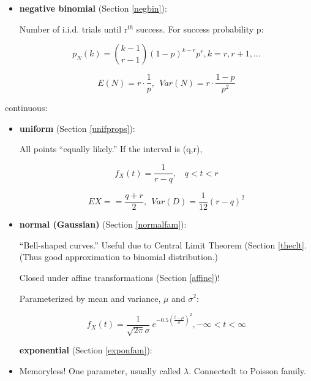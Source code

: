 \begin{itemize}
\begin{itemize}
   \item {\bf negative binomial} (Section \ref{negbin}):

   Number of i.i.d. trials until r$^{th}$ success.  For success
   probability p: 

   \begin{equation}
   p_N(k) =  \binom{k-1}{r-1} (1-p)^{k-r} p^r, k = r, r+1, ...
   \end{equation}

   \begin{equation}
   E(N) = r \cdot \frac{1}{p}, ~~ Var(N) = r \cdot \frac{1-p}{p^2}
   \end{equation}

   \end{itemize}

continuous:

   \begin{itemize}

   \item {\bf uniform} (Section \ref{unifprops}):

   All points ``equally likely.''  If the interval is (q,r),

   \begin{equation}
   f_X(t) = \frac{1}{r-q}, ~~~~ q < t < r
   \end{equation}

   \begin{equation}
   EX = = \frac{q+r}{2}, ~~ Var(D) = \frac{1}{12} (r-q)^2
   \end{equation}

   \item {\bf normal (Gaussian)} (Section \ref{normalfam}):

   ``Bell-shaped curves.''  Useful due to Central Limit Theorem (Section
   \ref{theclt}.  (Thus good approximation to binomial distribution.)

   Closed under affine transformations (Section \ref{affine})!

   Parameterized by mean and variance, $\mu$ and $\sigma^2$:

   \begin{equation}
   f_X(t) =  \frac{1}{\sqrt{2\pi} \sigma} 
   ~ e^{- 0.5 \left (\frac{t-\mu}{\sigma} \right )^2}, -\infty < t < \infty
   \end{equation}

   {\bf exponential} (Section \ref{exponfam}):

   \item Memoryless!  One parameter, usually called $\lambda$.
   Connectedt to Poisson family.


\end{itemize}
\end{itemize}
